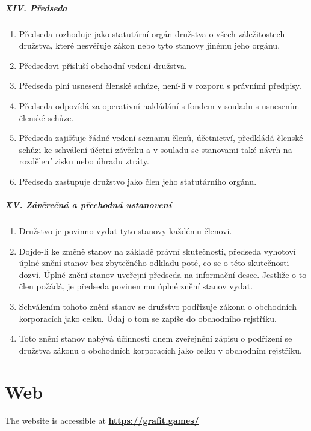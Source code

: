 \paragraph{XIV. Předseda}
\begin{enumerate}
    \item Předseda rozhoduje jako statutární orgán družstva o všech záležitostech družstva, které nesvěřuje zákon nebo tyto stanovy jinému jeho orgánu.
    \item Předsedovi přísluší obchodní vedení družstva.
    \item Předseda plní usnesení členské schůze, není-li v rozporu s právními předpisy.
    \item Předseda odpovídá za operativní nakládání s fondem v souladu s usnesením členské schůze.
    \item Předseda zajišťuje řádné vedení seznamu členů, účetnictví, předkládá členské schůzi ke schválení účetní závěrku a v souladu se stanovami také návrh na rozdělení zisku nebo úhradu ztráty.
    \item Předseda zastupuje družstvo jako člen jeho statutárního orgánu.
\end{enumerate}

\paragraph{XV. Závěrečná a přechodná ustanovení}
\begin{enumerate}
    \item Družstvo je povinno vydat tyto stanovy každému členovi.
    \item Dojde-li ke změně stanov na základě právní skutečnosti, předseda vyhotoví úplné znění stanov bez zbytečného odkladu poté, co se o této skutečnosti dozví. Úplné znění stanov uveřejní předseda na informační desce. Jestliže o to člen požádá, je předseda povinen mu úplné znění stanov vydat.
    \item Schválením tohoto znění stanov se družstvo podřizuje zákonu o obchodních korporacích jako celku. Údaj o tom se zapíše do obchodního rejstříku.
    \item Toto znění stanov nabývá účinnosti dnem zveřejnění zápisu o podřízení se družstva zákonu o obchodních korporacích jako celku v obchodním rejstříku.
\end{enumerate}

\chapter{Web}\label{ap:web}
The website is accessible at \href{https://grafit.games/}{\textbf{https://grafit.games/}}

